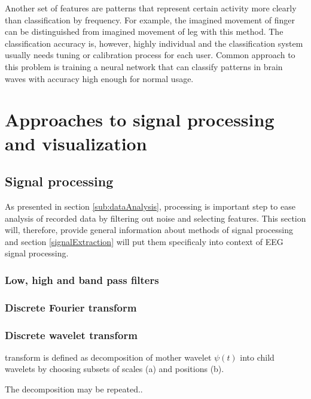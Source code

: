 Another set of features are patterns that represent certain activity more
clearly than classification by frequency. For example, the imagined movement of
finger can be distinguished from imagined movement of leg with this method. The
classification accuracy is, however, highly individual and the classification
system usually needs tuning or calibration process for each user. \cite{bcComm}
Common approach to this problem is training a neural network that can classify
patterns in brain waves with accuracy high enough for normal usage.

\chapter{Approaches to signal processing and visualization}
\label{appProcVis}
\section{Signal processing}
\label{sec:sigProc}
As presented in section \ref{sub:dataAnalysis}, processing is important
step to ease analysis of recorded data by filtering out noise and selecting
features. This section will, therefore, provide general information about
methods of signal processing and section \ref{signalExtraction} will put them
specificaly into context of EEG signal processing.


\subsection{Low, high and band pass filters}

\subsection{Discrete Fourier transform}

\subsection{Discrete wavelet transform}
transform is defined as decomposition of mother wavelet $\psi(t)$ into child
wavelets by choosing subsets of scales (a) and positions (b). 

The decomposition may be repeated..


